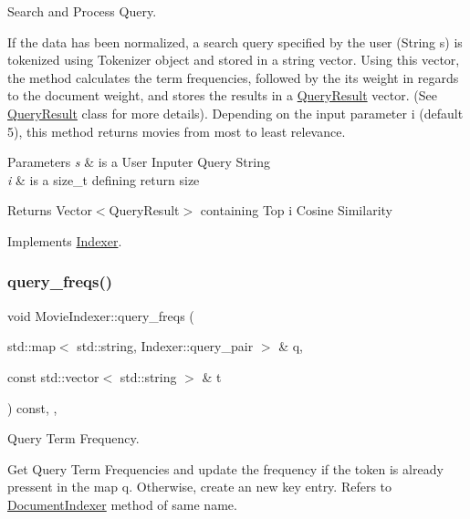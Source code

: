Search and Process Query. 

If the data has been normalized, a search query specified by the user (String s) is tokenized using Tokenizer object and stored in a string vector. Using this vector, the method calculates the term frequencies, followed by the its weight in regards to the document weight, and stores the results in a \hyperlink{class_query_result}{Query\+Result} vector. (See \hyperlink{class_query_result}{Query\+Result} class for more details). Depending on the input parameter i (default 5), this method returns movies from most to least relevance.


\begin{DoxyParams}{Parameters}
{\em s} & is a User Inputer Query String \\
\hline
{\em i} & is a size\+\_\+t defining return size \\
\hline
\end{DoxyParams}
\begin{DoxyReturn}{Returns}
Vector$<$\+Query\+Result$>$ containing Top i Cosine Similarity 
\end{DoxyReturn}


Implements \hyperlink{class_indexer_a8d98ba740db6f5f8521d557bf908aead}{Indexer}.

\mbox{\label{class_movie_indexer_a982d10037e8307649ee62eda078ae531}} 
\subsubsection{\texorpdfstring{query\+\_\+freqs()}{query\_freqs()}}
{\footnotesize\ttfamily void Movie\+Indexer\+::query\+\_\+freqs (\begin{DoxyParamCaption}\item[{std\+::map$<$ std\+::string, Indexer\+::query\+\_\+pair $>$ \&}]{q,  }\item[{const std\+::vector$<$ std\+::string $>$ \&}]{t }\end{DoxyParamCaption}) const\hspace{0.3cm}{\ttfamily [override]}, {\ttfamily [private]}, {\ttfamily [virtual]}}



Query Term Frequency. 

Get Query Term Frequencies and update the frequency if the token is already pressent in the map q. Otherwise, create an new key entry. Refers to \hyperlink{class_document_indexer}{Document\+Indexer} method of same name.


